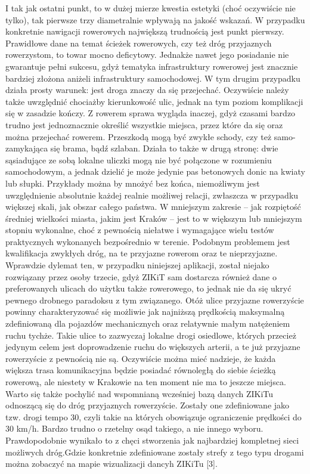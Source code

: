 I tak jak ostatni punkt, to w dużej mierze kwestia estetyki (choć oczywiście nie tylko), tak pierwsze trzy diametralnie wpływają na jakość wskazań. W przypadku konkretnie nawigacji rowerowych największą trudnością jest punkt pierwszy. Prawidłowe dane na temat ścieżek rowerowych, czy też dróg przyjaznych rowerzystom, to towar mocno deficytowy. Jednakże nawet jego posiadanie nie gwarantuje pełni sukcesu, gdyż tematyka infrastruktury rowerowej jest znacznie bardziej złożona aniżeli infrastruktury samochodowej. W tym drugim przypadku działa prosty warunek: jest droga znaczy da się przejechać. Oczywiście należy także uwzględnić chociażby kierunkowość ulic, jednak na tym poziom komplikacji się w zasadzie kończy. Z rowerem sprawa wygląda inaczej, gdyż czasami bardzo trudno jest jednoznacznie określić wszystkie miejsca, przez które da się oraz można przejechać rowerem. Przeszkodą mogą być zwykłe schody, czy też samo-zamykająca się brama, bądź szlaban. Działa to także w drugą stronę: dwie sąsiadujące ze sobą lokalne uliczki mogą nie być połączone w rozumieniu samochodowym, a jednak dzielić je może jedynie pas betonowych donic na kwiaty lub słupki. Przykłady można by mnożyć bez końca, niemożliwym jest uwzględnienie absolutnie każdej realnie możliwej relacji, zwłaszcza w przypadku większej skali, jak obszar całego państwa. W mniejszym zakresie – jak rozpiętość średniej wielkości miasta, jakim jest Kraków – jest to w większym lub mniejszym stopniu wykonalne, choć z pewnością niełatwe i wymagające wielu testów praktycznych wykonanych bezpośrednio w terenie. Podobnym problemem jest kwalifikacja zwykłych dróg, na te przyjazne rowerom oraz te nieprzyjazne. Wprawdzie dylemat ten, w przypadku niniejszej aplikacji, został niejako rozwiązany przez osoby trzecie, gdyż ZIKiT sam dostarcza również dane o preferowanych ulicach do użytku także rowerowego, to jednak nie da się ukryć pewnego drobnego paradoksu z tym związanego. Otóż ulice przyjazne rowerzyście powinny charakteryzować się możliwie jak najniższą prędkością maksymalną zdefiniowaną dla pojazdów mechanicznych oraz relatywnie małym natężeniem ruchu tychże. Takie ulice to zazwyczaj lokalne drogi osiedlowe, których przecież jedynym celem jest doprowadzenie ruchu do większych arterii, a te już przyjazne rowerzyście z pewnością nie są. Oczywiście można mieć nadzieje, że każda większa trasa komunikacyjna będzie posiadać równoległą do siebie ścieżką rowerową, ale niestety w Krakowie na ten moment nie ma to jeszcze miejsca.\newline
Warto się także pochylić nad wspomnianą wcześniej bazą danych ZIKiTu odnoszącą się do dróg przyjaznych rowerzyście. Zostały one zdefiniowane jako tzw. drogi tempo 30, czyli takie na których obowiązuje ograniczenie prędkości do 30 km/h. Bardzo trudno o rzetelny osąd takiego, a nie innego wyboru. Prawdopodobnie wynikało to z chęci stworzenia jak najbardziej kompletnej sieci możliwych dróg.Gdzie konkretnie zdefiniowane zostały strefy z tego typu drogami można zobaczyć na mapie wizualizacji dancyh ZIKiTu [3].\newline

